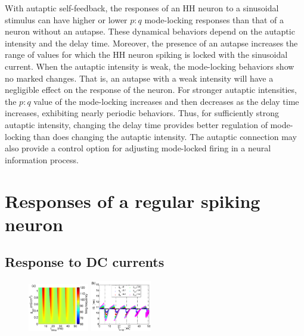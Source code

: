 \documentclass[twocolumn,showpacs,preprintnumbers,amsmath,amssymb,pre,superscriptaddress]{revtex4-1}
\begin{document}
\begin{CJK}{UTF8}{gbsn}
With autaptic self-feedback, the responses of an HH neuron to a sinusoidal stimulus can have higher or lower $p:q$ mode-locking responses than that of a neuron without an autapse. These dynamical behaviors depend on the autaptic intensity and the delay time. Moreover, the presence of an autapse increases the range of values for which the HH neuron spiking is locked with the sinusoidal current. When the autaptic intensity is weak, the mode-locking behaviors show no marked changes. That is, an autapse with a weak intensity will have a negligible effect on the response of the neuron. For stronger autaptic intensities, the $p:q$ value of the mode-locking increases and then decreases as the delay time increases, exhibiting nearly periodic behaviors. Thus, for sufficiently strong autaptic intensity, changing the delay time provides better regulation of mode-locking than does changing the autaptic intensity. The autaptic connection may also provide a control option for adjusting mode-locked firing in a neural information process. 


\section{Responses of a regular spiking neuron}
%
\subsection{Response to DC currents}

\begin{figure}
\begin{center}
\includegraphics[width=0.236\textwidth]{fig7a.eps}
\includegraphics[width=0.236\textwidth]{fig7b.eps}


\end{center}
\end{figure}
\end{CJK}
\end{document}
